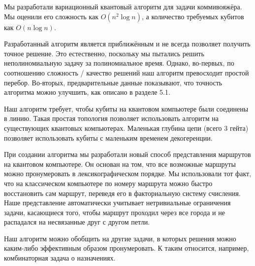 
Мы разработали вариационный квантовый алгоритм для задачи коммивояжёра. Мы оценили его сложность как $O(n^2 \log n)$, а количество требуемых кубитов как $O(n \log n)$.

Разработанный алгоритм является приближённым и не всегда позволяет получить точное решение. 
Это естественно, поскольку мы пытались решить неполиномиальную задачу за полиномиальное время. 
Однако, во-первых, по соотношению сложность / качество решений наш алгоритм превосходит простой перебор. 
Во-вторых, предварительные данные показывают, что точность алгоритма можно улучшить, как описано в разделе 5.1.

Наш алгоритм требует, чтобы кубиты на квантовом компьютере были соединены в линию. Такая простая топология позволяет использовать алгоритм на существующих квантовых компьютерах. Маленькая глубина цепи (всего 3 гейта) позволяет использовать кубиты с маленьким временем декогеренции. 

При создании алгоритма мы разработали новый способ представления маршрутов на квантовом компьютере.
Он основан на том, что все возможные маршруты можно пронумеровать в лексикографическом порядке.
Мы использовали тот факт, что на классическом компьютере по номеру маршрута можно быстро восстановить сам маршрут, переведя его в факториальную систему счисления.
Наше представление автоматически учитывает нетривиальные ограничения задачи, касающиеся того, чтобы маршрут проходил через все города и не распадался на несвязанные друг с другом петли.

Наш алгоритм можно обобщить на другие задачи, в которых решения можно каким-либо эффективным образом пронумеровать. К таким относится, например, комбинаторная задача о назначениях.








\sloppy
\showbib


 
